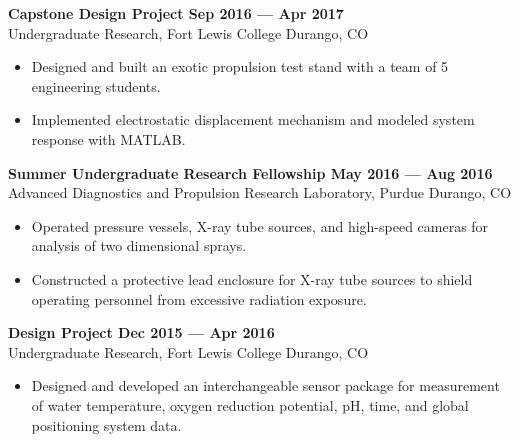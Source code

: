 \textbf{Capstone Design Project \hfill Sep 2016 --- Apr 2017}\\
Undergraduate Research, Fort Lewis College \hfill Durango, CO

\begin{itemize}
    \item Designed and built an exotic propulsion test stand with a team of 5 engineering students.
    \item Implemented electrostatic displacement mechanism and modeled system response with MATLAB.
\end{itemize}

\textbf{Summer Undergraduate Research Fellowship \hfill May 2016 --- Aug 2016}\\
Advanced Diagnostics and Propulsion Research Laboratory, Purdue \hfill Durango, CO

\begin{itemize}
    \item Operated pressure vessels, X-ray tube sources, and high-speed cameras for analysis of two dimensional sprays.
    \item Constructed a protective lead enclosure for X-ray tube sources to shield operating personnel from excessive radiation exposure.
\end{itemize}

\textbf{Design Project \hfill Dec 2015 --- Apr 2016}\\
Undergraduate Research, Fort Lewis College \hfill Durango, CO

\begin{itemize}
    \item Designed and developed an interchangeable sensor package for measurement of water temperature, oxygen reduction potential, pH, time, and global positioning system data.
\end{itemize}
